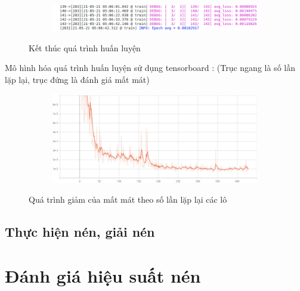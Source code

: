 \begin{figure}
    \begin{subfigure}{0.8\textwidth}
        \includegraphics[width=1.\linewidth]{Chapters/items/colab2.jpg}
        \caption{}
        \label{fig: colab2}
    \end{subfigure}
    \caption{Kết thúc quá trình huấn luyện}
\end{figure}

Mô hình hóa quá trình huấn luyện sử dụng tensorboard :
(Trục ngang là số lần lặp lại, trục đứng là đánh giá mất mát)

\begin{figure}
    \begin{subfigure}{0.8\textwidth}
        \includegraphics[width=1.\linewidth]{Chapters/items/visualizeTraining.jpg}
        \caption{}
        \label{fig: visualize}
    \end{subfigure}
    \caption{Quá trình giảm của mất mát theo số lần lặp lại các lô}
\end{figure}

\subsection{Thực hiện nén, giải nén}
\section{Đánh giá hiệu suất nén}


